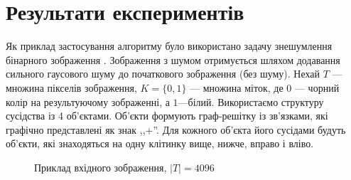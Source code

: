 \section{Результати експериментів}

Як приклад застосування алгоритму було використано задачу знешумлення бінарного зображення 
\cite{Boykov,Boykov_2,comp_vision,Greig_port}. Зображення з шумом отримується шляхом додавання сильного
гаусового шуму до початкового зображення (без шуму). 
Нехай $T$ --- множина пікселів зображення, $K=\{0,1\}$ --- множина міток, де $0$ --- чорний колір 
на результуючому зображенні, а $1$---білий. Використаємо структуру 
сусідства із 4 об'єктами. Об'єкти формують граф-решітку із зв'язками, які графічно представлені як знак ,,$+$''.
Для кожного об'єкта його сусідами будуть об'єкти, які знаходяться на одну клітинку вище, нижче, вправо і вліво.
\begin{figure}[h]
    \centering
    \qquad
    \caption{Приклад вхідного зображення, $|T|=4096$}%
    \label{fig:a2_original}
\end{figure}

